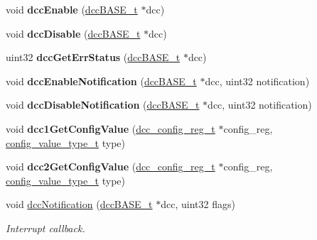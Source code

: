 \begin{DoxyCompactItemize}
void {\bfseries dcc\+Enable} (\mbox{\hyperlink{reg__dcc_8h_a205f6a2ff77f73c35e0033f9d7a4567b}{dcc\+B\+A\+S\+E\+\_\+t}} $\ast$dcc)
\item 
\mbox{\label{group__DCC_gad51eac906f3470d76655bb3f9bf7fc3a}} 
void {\bfseries dcc\+Disable} (\mbox{\hyperlink{reg__dcc_8h_a205f6a2ff77f73c35e0033f9d7a4567b}{dcc\+B\+A\+S\+E\+\_\+t}} $\ast$dcc)
\item 
\mbox{\label{group__DCC_ga325b386d3766e2dbfaddcc5b728babc3}} 
uint32 {\bfseries dcc\+Get\+Err\+Status} (\mbox{\hyperlink{reg__dcc_8h_a205f6a2ff77f73c35e0033f9d7a4567b}{dcc\+B\+A\+S\+E\+\_\+t}} $\ast$dcc)
\item 
\mbox{\label{group__DCC_ga1e51d602796f878aaa0a604079c1b281}} 
void {\bfseries dcc\+Enable\+Notification} (\mbox{\hyperlink{reg__dcc_8h_a205f6a2ff77f73c35e0033f9d7a4567b}{dcc\+B\+A\+S\+E\+\_\+t}} $\ast$dcc, uint32 notification)
\item 
\mbox{\label{group__DCC_ga9d6ad662d36a4787c67bf9431c7ad54d}} 
void {\bfseries dcc\+Disable\+Notification} (\mbox{\hyperlink{reg__dcc_8h_a205f6a2ff77f73c35e0033f9d7a4567b}{dcc\+B\+A\+S\+E\+\_\+t}} $\ast$dcc, uint32 notification)
\item 
\mbox{\label{group__DCC_ga5efb7d5a1c218f18daffc4bdab18b63a}} 
void {\bfseries dcc1\+Get\+Config\+Value} (\mbox{\hyperlink{structdcc__config__reg}{dcc\+\_\+config\+\_\+reg\+\_\+t}} $\ast$config\+\_\+reg, \mbox{\hyperlink{sys__common_8h_a9daf9a5992391b058477d28d107ee5e2}{config\+\_\+value\+\_\+type\+\_\+t}} type)
\item 
\mbox{\label{group__DCC_gae236ac58f7094725fb843ec9b2cd87eb}} 
void {\bfseries dcc2\+Get\+Config\+Value} (\mbox{\hyperlink{structdcc__config__reg}{dcc\+\_\+config\+\_\+reg\+\_\+t}} $\ast$config\+\_\+reg, \mbox{\hyperlink{sys__common_8h_a9daf9a5992391b058477d28d107ee5e2}{config\+\_\+value\+\_\+type\+\_\+t}} type)
\item 
void \mbox{\hyperlink{group__DCC_ga9301dd9fb759cb7cd0e3da1cae7d5f99}{dcc\+Notification}} (\mbox{\hyperlink{reg__dcc_8h_a205f6a2ff77f73c35e0033f9d7a4567b}{dcc\+B\+A\+S\+E\+\_\+t}} $\ast$dcc, uint32 flags)
\begin{DoxyCompactList}\small\item\em Interrupt callback. \end{DoxyCompactList}\end{DoxyCompactItemize}


